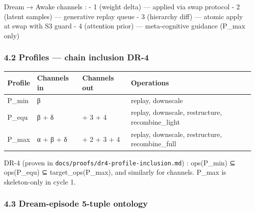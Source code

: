 \documentclass[
]{article}
\newcounter{none} %
\begin{document}
Dream → Awake channels : - 1 (weight delta) --- applied via swap
protocol - 2 (latent samples) --- generative replay queue - 3 (hierarchy
diff) --- atomic apply at swap with S3 guard - 4 (attention prior) ---
meta-cognitive guidance (P\_max only)

\subsubsection{4.2 Profiles --- chain inclusion
DR-4}\label{profiles-chain-inclusion-dr-4}

{\def\LTcaptype{none} %
\begin{longtable}[]{@{}
  >{\raggedright\arraybackslash}p{}
  >{\raggedright\arraybackslash}p{}
  >{\raggedright\arraybackslash}p{}
  >{\raggedright\arraybackslash}p{}@{}}
\toprule\noalign{}
\begin{minipage}[b]{\linewidth}\raggedright
Profile
\end{minipage} & \begin{minipage}[b]{\linewidth}\raggedright
Channels in
\end{minipage} & \begin{minipage}[b]{\linewidth}\raggedright
Channels out
\end{minipage} & \begin{minipage}[b]{\linewidth}\raggedright
Operations
\end{minipage} \\
\midrule\noalign{}
\endhead
\bottomrule\noalign{}
\endlastfoot
P\_min & β & 1 & replay, downscale \\
P\_equ & β + δ & 1 + 3 + 4 & replay, downscale, restructure,
recombine\_light \\
P\_max & α + β + δ & 1 + 2 + 3 + 4 & replay, downscale, restructure,
recombine\_full \\
\end{longtable}
}

DR-4 (proven in \texttt{docs/proofs/dr4-profile-inclusion.md}) :
ops(P\_min) ⊆ ops(P\_equ) ⊆ target\_ops(P\_max), and similarly for
channels. P\_max is skeleton-only in cycle 1.

\subsubsection{4.3 Dream-episode 5-tuple
ontology}\label{dream-episode-5-tuple-ontology}
\end{document}

